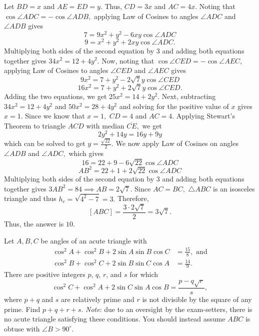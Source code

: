 \begin{solution}[name={Solution by peelybonehead}]
	Let $BD = x$ and $AE = ED = y.$ Thus, $CD = 3x$ and $AC = 4x.$ Noting that $\cos{\angle{ADC}} = -\cos{\angle ADB},$ applying Law of Cosines to angles $\angle ADC$ and $\angle ADB$ gives
	\[7 = 9x^2 + y^2 - 6xy\cos{\angle ADC}\]\[9 = x^2 + y^2 + 2xy\cos{\angle ADC}.\]Multiplying both sides of the second equation by $3$ and adding both equations together gives $34x^2 = 12 + 4y^2.$ Now, noting that $\cos{\angle{CED}} = -\cos{\angle AEC},$ applying Law of Cosines to angles $\angle CED$ and $\angle AEC$ gives
	\[9x^2 = 7 + y^2 - 2\sqrt{7}y\cos{\angle CED}\]\[16x^2 = 7 + y^2 + 2\sqrt{7}y\cos{\angle CED}.\]Adding the two equations, we get $25x^2 = 14 + 2y^2.$	Next, subtracting $34x^2 = 12 + 4y^2$ and $50x^2 = 28 + 4y^2$ and solving for the positive value of $x$ gives $x= 1.$	Since we know that $x=1,$ $CD = 4$ and $AC = 4.$ Applying Stewart's Theorem to triangle $ACD$ with median $\overline{CE},$ we get
	\[2y^2 + 14y = 16y + 9y\]which can be solved to get $y = \frac{\sqrt{22}}{2}.$ We now apply Law of Cosines on angles $\angle ADB$ and $\angle ADC,$ which gives
	\[16 = 22 + 9 - 6\sqrt{22}\cos{\angle ADC}\]\[AB^2 = 22 + 1 + 2\sqrt{22}\cos{\angle ADC}\]Multiplying both sides of the second equation by $3$ and adding both equations together gives $3AB^2 = 84 \implies AB = 2\sqrt{7}.$ Since $AC = BC,$ $\triangle ABC$ is an isosceles triangle and thus $h_c = \sqrt{4^2-7} = 3.$ Therefore,$$[ABC] = \frac{3 \cdot 2\sqrt{7}}{2} = 3\sqrt{7}.$$
	Thus, the answer is $\boxed{10}.$
\end{solution}







\begin{question}[name={2013 AIME II, \href{https://artofproblemsolving.com/community/c4p3003353}{Problem 15}}]
	Let $A,B,C$ be angles of an acute triangle with
	\begin{align*}
		\cos^2 A + \cos^2 B + 2 \sin A \sin B \cos C &= \frac{15}{8}, \text{ and} \\
		\cos^2 B + \cos^2 C + 2 \sin B \sin C \cos A &= \frac{14}{9}.
	\end{align*}There are positive integers $p$, $q$, $r$, and $s$ for which\[ \cos^2 C + \cos^2 A + 2 \sin C \sin A \cos B = \frac{p-q\sqrt{r}}{s}, \]where $p+q$ and $s$ are relatively prime and $r$ is not divisible by the square of any prime. Find $p+q+r+s$. \textit{Note}: due to an oversight by the exam-setters, there is no acute triangle satisfying these conditions. You should instead assume $ABC$ is obtuse with $\angle B > 90^{\circ}$.
\end{question}


